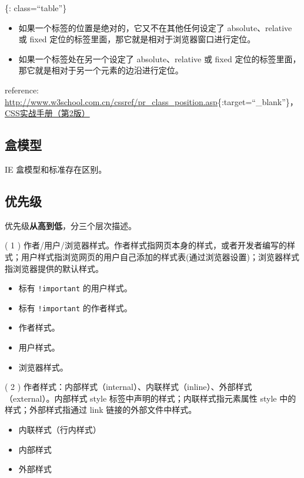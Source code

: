 \{: class=``table''\}

\begin{itemize}
\tightlist
\item
  如果一个标签的位置是绝对的，它又不在其他任何设定了 absolute、relative
  或 fixed 定位的标签里面，那它就是相对于浏览器窗口进行定位。
\item
  如果一个标签处在另一个设定了 absolute、relative 或 fixed
  定位的标签里面，那它就是相对于另一个元素的边沿进行定位。
\end{itemize}

reference:
\url{http://www.w3school.com.cn/cssref/pr_class_position.asp}\{:target=``\_blank''\}，\href{http://book.douban.com/subject/4861462/}{CSS实战手册（第2版）}

\subsection{盒模型}\label{ux76d2ux6a21ux578b}

IE 盒模型和标准存在区别。

\subsection{优先级}\label{ux4f18ux5148ux7ea7}

优先级\textbf{从高到低}，分三个层次描述。

( 1 )
作者/用户/浏览器样式。作者样式指网页本身的样式，或者开发者编写的样式；用户样式指浏览网页的用户自己添加的样式表(通过浏览器设置)；浏览器样式指浏览器提供的默认样式。

\begin{itemize}
\tightlist
\item
  标有 \lstinline"!important" 的用户样式。
\item
  标有 \lstinline"!important" 的作者样式。
\item
  作者样式。
\item
  用户样式。
\item
  浏览器样式。
\end{itemize}

( 2 )
作者样式：内部样式（internal）、内联样式（inline）、外部样式（external）。内部样式
style 标签中声明的样式；内联样式指元素属性 style
中的样式；外部样式指通过 link 链接的外部文件中样式。

\begin{itemize}
\tightlist
\item
  内联样式（行内样式）
\item
  内部样式
\item
  外部样式
\end{itemize}

